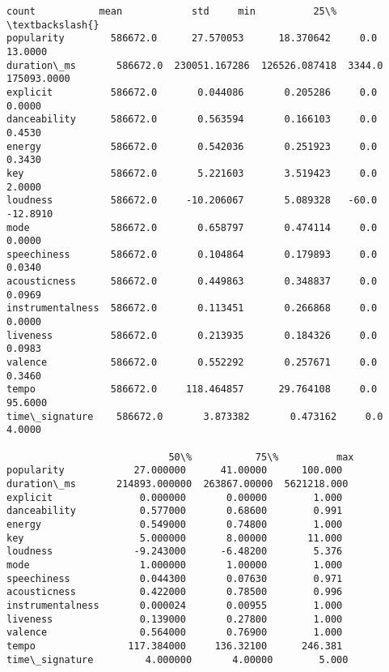 \documentclass[11pt]{article}
\makeatletter
\newcommand{\boxspacing}{\kern\kvtcb@left@rule\kern\kvtcb@boxsep}
\newcommand{\prompt}[4]{
        {\ttfamily\llap{{\color{#2}[#3]:\hspace{3pt}#4}}\vspace{-\baselineskip}}
    }
\makeatother
\begin{document}
            \begin{tcolorbox}[breakable, size=fbox, boxrule=.5pt, pad at break*=1mm, opacityfill=0]
\prompt{Out}{outcolor}{10}{\boxspacing}
\begin{Verbatim}[commandchars=\\\{\}]
                     count           mean            std     min          25\%  \textbackslash{}
popularity        586672.0      27.570053      18.370642     0.0      13.0000
duration\_ms       586672.0  230051.167286  126526.087418  3344.0  175093.0000
explicit          586672.0       0.044086       0.205286     0.0       0.0000
danceability      586672.0       0.563594       0.166103     0.0       0.4530
energy            586672.0       0.542036       0.251923     0.0       0.3430
key               586672.0       5.221603       3.519423     0.0       2.0000
loudness          586672.0     -10.206067       5.089328   -60.0     -12.8910
mode              586672.0       0.658797       0.474114     0.0       0.0000
speechiness       586672.0       0.104864       0.179893     0.0       0.0340
acousticness      586672.0       0.449863       0.348837     0.0       0.0969
instrumentalness  586672.0       0.113451       0.266868     0.0       0.0000
liveness          586672.0       0.213935       0.184326     0.0       0.0983
valence           586672.0       0.552292       0.257671     0.0       0.3460
tempo             586672.0     118.464857      29.764108     0.0      95.6000
time\_signature    586672.0       3.873382       0.473162     0.0       4.0000

                            50\%           75\%          max
popularity            27.000000      41.00000      100.000
duration\_ms       214893.000000  263867.00000  5621218.000
explicit               0.000000       0.00000        1.000
danceability           0.577000       0.68600        0.991
energy                 0.549000       0.74800        1.000
key                    5.000000       8.00000       11.000
loudness              -9.243000      -6.48200        5.376
mode                   1.000000       1.00000        1.000
speechiness            0.044300       0.07630        0.971
acousticness           0.422000       0.78500        0.996
instrumentalness       0.000024       0.00955        1.000
liveness               0.139000       0.27800        1.000
valence                0.564000       0.76900        1.000
tempo                117.384000     136.32100      246.381
time\_signature         4.000000       4.00000        5.000
\end{Verbatim}
\end{tcolorbox}
        
\end{document}
